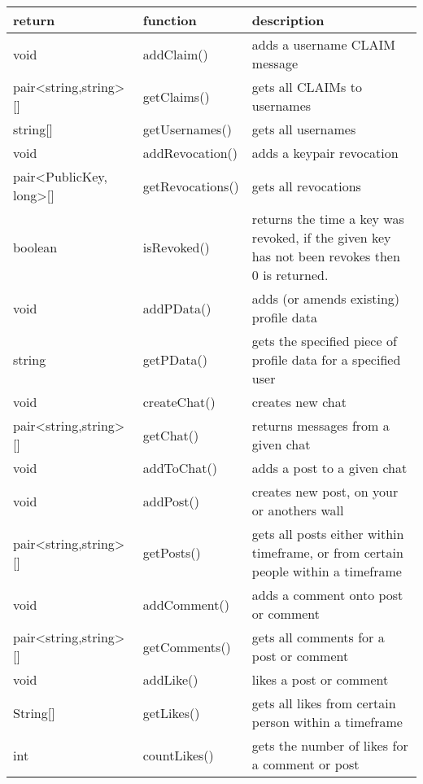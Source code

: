 \begin{table}[h]
    \centering
    \begin{tabular}{p{3cm}p{3cm}p{9cm}}
    return                & function       & description\\ \hline
    
    void                  & addClaim()     & adds a username CLAIM message\\
    pair<string,string>[] & getClaims()    & gets all CLAIMs to usernames\\
    string[]              & getUsernames() & gets all usernames\\
    
    void                    & addRevocation()  & adds a keypair revocation\\
    pair<PublicKey, long>[] & getRevocations() & gets all revocations\\
    boolean                 & isRevoked()      & returns the time a key was revoked, if the given key has not been revokes then 0 is returned.\\
    
    void   & addPData() & adds (or amends existing) profile data\\
    string & getPData() & gets the specified piece of profile data for a specified user\\
    
    void                  & createChat() & creates new chat\\
    pair<string,string>[] & getChat()    & returns messages from a given chat\\
    void                  & addToChat()  & adds a post to a given chat\\
    
    void                  & addPost()  & creates new post, on your or anothers wall\\
    pair<string,string>[] & getPosts() & gets all posts either within timeframe, or from certain people within a timeframe\\
    
    void                  &  addComment() & adds a comment onto post or comment\\
    pair<string,string>[] & getComments() & gets all comments for a post or comment\\
    
    void     & addLike() & likes a post or comment\\
    String[] & getLikes() & gets all likes from certain person within a timeframe\\
    int      & countLikes() & gets the number of likes for a comment or post\\
    

\end{tabular}
\end{table}
